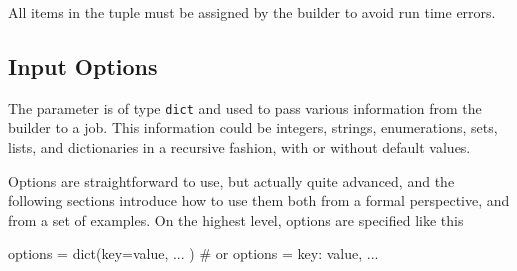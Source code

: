 All items in the \datasets tuple must be assigned by the builder to
avoid run time errors.




\subsection*{Input Options}

The \options parameter is of type \texttt{dict} and used to pass
various information from the builder to a job.  This information could
be integers, strings, enumerations, sets, lists, and dictionaries in a
recursive fashion, with or without default values.

Options are straightforward to use, but actually quite advanced, and
the following sections introduce how to use them both from a formal
perspective, and from a set of examples.  On the highest level,
options are specified like this
\begin{python}
  options = dict(key=value, ... )  # or
  options = {key: value, ...}
\end{python}


